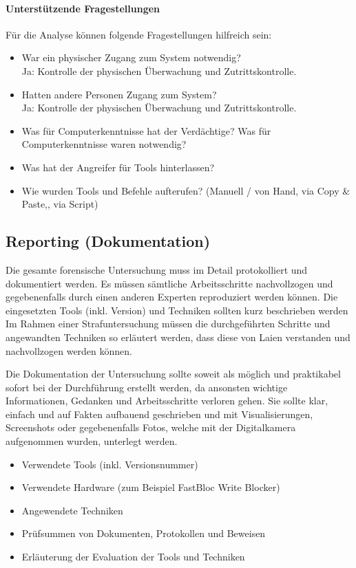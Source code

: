 \paragraph{Unterstützende Fragestellungen}
Für die Analyse können folgende Fragestellungen hilfreich sein:
\begin{itemize}
\item War ein physischer Zugang zum System notwendig?\\
Ja: Kontrolle der physischen Überwachung und Zutrittskontrolle.
\item Hatten andere Personen Zugang zum System?\\
Ja: Kontrolle der physischen Überwachung und Zutrittskontrolle.
\item Was für Computerkenntnisse hat der Verdächtige? Was für Computerkenntnisse waren notwendig?
\item Was hat der Angreifer für Tools hinterlassen?
\item Wie wurden Tools und Befehle aufterufen? (Manuell / von Hand, via Copy \& Paste,, via Script)
\end{itemize}

\subsection{Reporting (Dokumentation)}
Die gesamte forensische Untersuchung muss im Detail protokolliert und dokumentiert werden. Es müssen sämtliche Arbeitsschritte nachvollzogen und gegebenenfalls durch einen anderen Experten reproduziert werden können. Die eingesetzten Tools (inkl. Version) und Techniken sollten kurz beschrieben werden Im Rahmen einer Strafuntersuchung müssen die durchgeführten Schritte und angewandten Techniken so erläutert werden, dass diese von Laien verstanden und nachvollzogen werden können.

Die Dokumentation der Untersuchung sollte soweit als möglich und praktikabel sofort bei der Durchführung erstellt werden, da ansonsten wichtige Informationen, Gedanken und Arbeitsschritte verloren gehen. Sie sollte klar, einfach und auf Fakten aufbauend geschrieben und mit Visualisierungen, Screenshots oder gegebenenfalls Fotos, welche mit der Digitalkamera aufgenommen wurden, unterlegt werden. 

\begin{itemize}
\item Verwendete Tools (inkl. Versionsnummer)
\item Verwendete Hardware (zum Beispiel FastBloc Write Blocker)
\item Angewendete Techniken
\item Prüfsummen von Dokumenten, Protokollen und Beweisen
\item Erläuterung der Evaluation der Tools und Techniken
\end{itemize}

